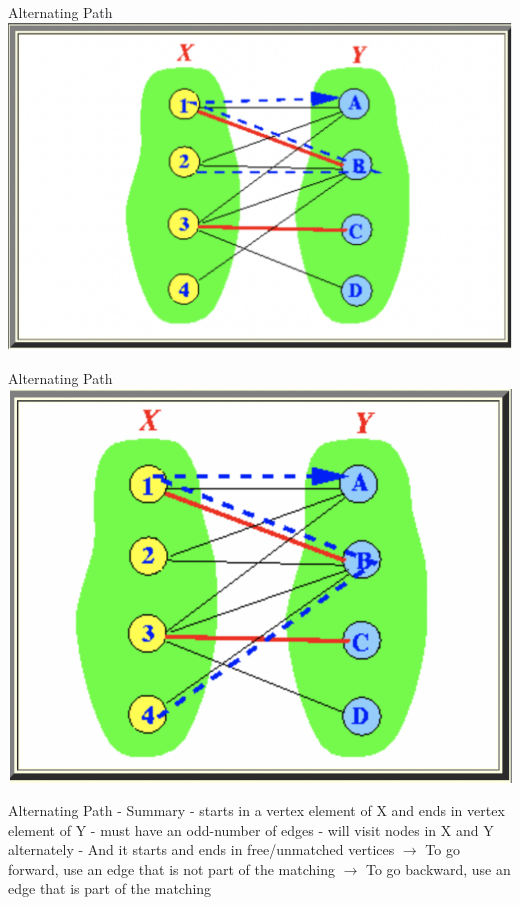 \begin{frame}{Alternating Path}
\includegraphics[width=.8
\linewidth]{img/bipartite/alternating2.png}
  
\end{frame}

\begin{frame}{Alternating Path}
\includegraphics[width=.8\linewidth]{img/bipartite/alternating3.png}
  
\end{frame}

\begin{frame}{Alternating Path - Summary}
- starts in a vertex element of X and ends in vertex element of Y\newline
- must have an odd-number of edges\newline
- will visit nodes in X and Y alternately\newline
- And it starts and ends in free/unmatched vertices\newline
\newline
$\rightarrow$ To go forward, use an edge that is not part of the matching\newline
$\rightarrow$ To go backward, use an edge that is part of the matching\newline
  
\end{frame}

